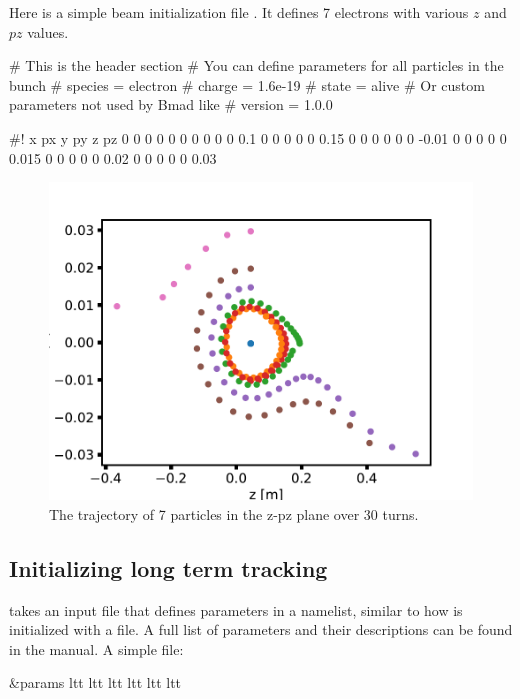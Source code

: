 \documentclass{hitec}     %
\begin{document}
{Here is a simple beam initialization file . It defines 7 electrons with various $z$ and $pz$ values.
\begin{code}
# This is the header section
# You can define parameters for all particles in the bunch
# species = electron
# charge  = 1.6e-19
# state   = alive
# Or custom parameters not used by Bmad like
# version = 1.0.0

#! x   px   y   py   z     pz    
   0   0    0   0    0     0     
   0   0    0   0    0.1   0     
   0   0    0   0    0.15  0     
   0   0    0   0    0     -0.01 
   0   0    0   0    0     0.015 
   0   0    0   0    0     0.02  
   0   0    0   0    0     0.03  
\end{code}

\begin{figure}[t]
    \centering
    \includegraphics[width=0.8\linewidth]{figures/ltt.pdf}
    \caption{The trajectory of 7 particles in the z-pz plane over 30 turns.}
    \label{f:ltt}
\end{figure}

\subsection{Initializing long term tracking}
\ltt takes an input file that defines parameters in a namelist, similar to how \tao is initialized with a  file. 
A full list of parameters and their descriptions can be found in the \ltt manual.
A simple   file:
\begin{code}
&params
  ltt%
  ltt%
  ltt%
  ltt%
  ltt%
  ltt%


\end{code}}
\end{document}
